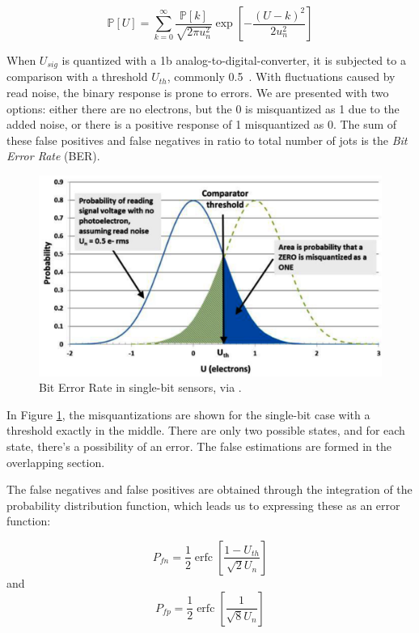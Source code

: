 \begin{equation}\mathbb{P}[U]=\sum_{k=0}^{\infty} \frac{\mathbb{P}[k]}{\sqrt{2 \pi u_{n}^{2}}} \exp \left[-\frac{(U-k)^{2}}{2 u_{n}^{2}}\right]
\end{equation}

When $U_{sig}$ is quantized with a 1b analog-to-digital-converter, it is subjected to a comparison with a threshold $U_{th}$, commonly 0.5~\cite{FossumSiMulQIS}. With fluctuations caused by read noise, the binary response is prone to errors. 
We are presented with two options: either there are no electrons, but the 0 is misquantized as 1 due to the added noise, or there is a positive response of 1 misquantized as 0. The sum of these false positives and false negatives in ratio to total number of jots is the \textit{Bit Error Rate} (BER).

\begin{figure}[h]
  \centering
  \includegraphics[width=0.8\linewidth]{imgs/ber.png}
  \caption{Bit Error Rate in single-bit sensors, via \cite{FossumSiMulQIS}.}
  \label{fig:berrate}
\end{figure}

In Figure \ref{fig:berrate}, the misquantizations are shown for the single-bit case with a threshold exactly in the middle. There are only two possible states, and for each state, there's a possibility of an error. The false estimations are formed in the overlapping section.

The false negatives and false positives are obtained through the integration of the probability distribution function,
which leads us to expressing these as an error function:

\begin{equation}
    P_{f n}=\frac{1}{2} \operatorname{erfc}\left[\frac{1-U_{t h}}{\sqrt{2} U_{n}}\right]
\end{equation}
and
\begin{equation}
P_{f p}=\frac{1}{2} \operatorname{erfc}\left[\frac{1}{\sqrt{8} U_{n}}\right]
\end{equation}

